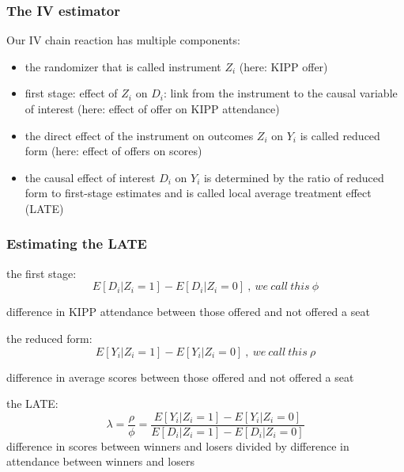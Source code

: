 \documentclass{beamer}
\begin{document}
\begin{frame}
\frametitle{The IV estimator}
Our IV chain reaction has multiple components:
\begin{itemize}
	\item the randomizer that is called instrument $Z_i$ (here: KIPP offer)
	\item first stage: effect of $Z_i$ on $D_i$: link from the instrument to the causal variable of interest (here: effect of offer on KIPP attendance)
	\item the direct effect of the instrument on outcomes $Z_i$ on $Y_i$ is called reduced form (here: effect of offers on scores)
	\item the causal effect of interest $D_i$ on $Y_i$ is determined by the ratio of reduced form to first-stage estimates and is called local average treatment effect (LATE)
\end{itemize}



\end{frame}

\begin{frame}
\frametitle{Estimating the LATE}
the first stage:
$$E[D_i|Z_i=1]-E[D_i|Z_i=0]~,~we ~call ~this ~\phi$$

difference in KIPP attendance between those offered and not offered a seat

the reduced form:
$$E[Y_i|Z_i=1]-E[Y_i|Z_i=0]~,~we ~call ~this ~\rho$$

difference in average scores between those offered and not offered a seat

the LATE:
$$\lambda = \frac{\rho}{\phi} = \frac{E[Y_i|Z_i=1]-E[Y_i|Z_i=0]}{E[D_i|Z_i=1]-E[D_i|Z_i=0]} $$
difference in scores between winners and losers divided by difference in attendance between winners and losers

\end{frame}
\end{document}
